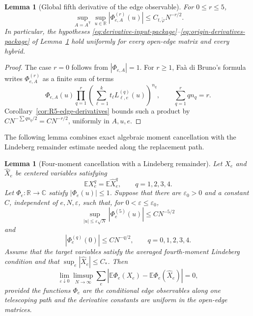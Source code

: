 \documentclass[10pt,a4paper]{amsart}
\newtheorem{lemma}[theorem]{Lemma}
\newcommand{\E}{\mathbb E}
\newcommand{\R}{\mathbb R}
\begin{document}
\begin{lemma}[Global fifth derivative of the edge observable]
\label{lem:R5-Phi-derivatives}
For \(0\le r\le5\),
\begin{equation}\label{eq:R5-Phi-bound}
 \sup_{A=A^{\mathsf T}}\sup_{u\in\mathbb R}
 |\Phi_{e,A}^{(r)}(u)|
 \le C_{t,\widetilde\varphi}N^{-r/2}.
\end{equation}
In particular, the hypotheses
\eqref{eq:derivative-input-package}--\eqref{eq:origin-derivatives-package}
of Lemma~\ref{lem:four-moment-cancel-package} hold uniformly for every
open-edge matrix and every hybrid.
\end{lemma}

\begin{proof}
The case \(r=0\) follows from \(|\Phi_{e,A}|=1\).  For \(r\ge1\),
Fa\`a di Bruno's formula writes \(\Phi_{e,A}^{(r)}\) as a finite sum of
terms
\[
 \Phi_{e,A}(u)
 \prod_{q=1}^r
 \left(\sum_{\ell=1}^kt_\ell
 L_{\ell,e}^{(q)}(u)\right)^{n_q},
 \qquad
 \sum_{q=1}^r qn_q=r.
\]
Corollary~\ref{cor:R5-edge-derivatives} bounds such a product by
\(C N^{-\sum qn_q/2}=CN^{-r/2}\), uniformly in \(A,u,e\).
\end{proof}

The following lemma combines exact algebraic moment cancellation with the
Lindeberg remainder estimate needed along the replacement path.

\begin{lemma}[Four-moment cancellation with a Lindeberg remainder]
\label{lem:four-moment-cancel-package}
Let $X_e$ and $\widehat X_e$ be centered variables satisfying
\begin{equation}\label{eq:four-match-lemma-package}
 \E X_e^q=\E\widehat X_e^q,
 \qquad q=1,2,3,4.
\end{equation}
Let $\Phi_e:\R\to\mathbb C$ satisfy $|\Phi_e(u)|\le1$.  Suppose that
there are $\varepsilon_0>0$ and a constant $C$, independent of
$e,N,\varepsilon$, such that, for $0<\varepsilon\le\varepsilon_0$,
\begin{equation}\label{eq:derivative-input-package}
 \sup_{|u|\le\varepsilon\sqrt N}
 |\Phi_e^{(5)}(u)|\le C N^{-5/2}
\end{equation}
and
\begin{equation}\label{eq:origin-derivatives-package}
 |\Phi_e^{(q)}(0)|\le C N^{-q/2},
 \qquad q=0,1,2,3,4.
\end{equation}
Assume that the target variables satisfy the averaged fourth-moment Lindeberg
condition and that $\sup_e|\widehat X_e|\le C_*$.  Then
\begin{equation}\label{eq:four-comparison-error-package}
 \lim_{\varepsilon\downarrow0}
 \limsup_{N\to\infty}
 \sum_e
 \left|
 \E\Phi_e(X_e)-\E\Phi_e(\widehat X_e)
 \right|=0,
\end{equation}
provided the functions $\Phi_e$ are the conditional edge observables along
one telescoping path and the derivative constants are uniform in the open-edge
matrices.
\end{lemma}
\end{document}
